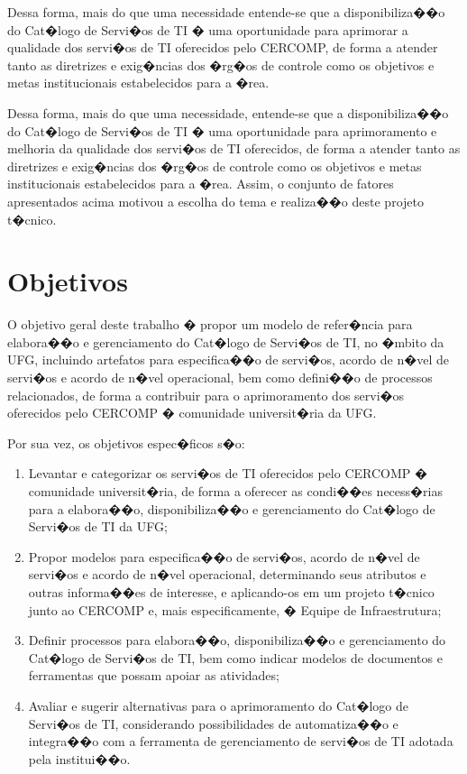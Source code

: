Dessa forma, mais do que uma necessidade entende-se que a disponibiliza��o do Cat�logo de Servi�os de TI � uma oportunidade para aprimorar a qualidade dos servi�os de TI oferecidos pelo CERCOMP, de forma a atender tanto as diretrizes e exig�ncias dos �rg�os de controle como os objetivos e metas institucionais estabelecidos para a �rea.

Dessa forma, mais do que uma necessidade, entende-se que a disponibiliza��o do Cat�logo de Servi�os de TI � uma oportunidade para aprimoramento e melhoria da qualidade dos servi�os de TI oferecidos, de forma a atender tanto as diretrizes e exig�ncias dos �rg�os de controle como os objetivos e metas institucionais estabelecidos para a �rea. Assim, o conjunto de fatores apresentados acima motivou a escolha do tema e realiza��o deste projeto t�cnico.


\section{Objetivos}
\label{sec:objetivos}

O objetivo geral deste trabalho � propor um modelo de refer�ncia para elabora��o e gerenciamento do Cat�logo de Servi�os de TI, no �mbito da UFG, incluindo artefatos para especifica��o de servi�os, acordo de n�vel de servi�os e acordo de n�vel operacional, bem como defini��o de processos relacionados, de forma a contribuir para o aprimoramento dos servi�os oferecidos pelo CERCOMP � comunidade universit�ria da UFG.

Por sua vez, os objetivos espec�ficos s�o:
\begin{enumerate}
  \item Levantar e categorizar os servi�os de TI oferecidos pelo CERCOMP � comunidade universit�ria, de forma a oferecer as condi��es necess�rias para a elabora��o, disponibiliza��o e gerenciamento do Cat�logo de Servi�os de TI da UFG;
  \item Propor modelos para especifica��o de servi�os, acordo de n�vel de servi�os e acordo de n�vel operacional, determinando seus atributos e outras informa��es de interesse, e aplicando-os em um projeto t�cnico junto ao CERCOMP e, mais especificamente, � Equipe de Infraestrutura;
  \item Definir processos para elabora��o, disponibiliza��o e gerenciamento do Cat�logo de Servi�os de TI, bem como indicar modelos de documentos e ferramentas que possam apoiar as atividades;
  \item Avaliar e sugerir alternativas para o aprimoramento do Cat�logo de Servi�os de TI, considerando possibilidades de automatiza��o e integra��o com a ferramenta de gerenciamento de servi�os de TI adotada pela institui��o.
\end{enumerate}

